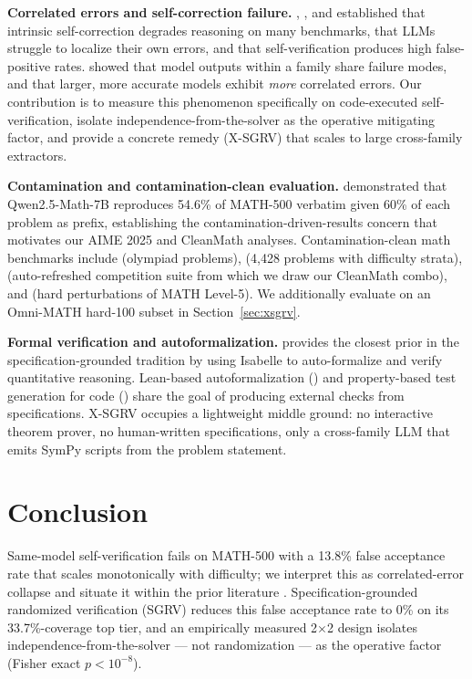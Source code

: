 \documentclass{article}
\begin{document}
\textbf{Correlated errors and self-correction failure.} \citet{huang2024selfcorrect}, \citet{tyen2024llm}, and \citet{stechly2024selfverify} established that intrinsic self-correction degrades reasoning on many benchmarks, that LLMs struggle to localize their own errors, and that self-verification produces high false-positive rates. \citet{kim2025correlated} showed that model outputs within a family share failure modes, and that larger, more accurate models exhibit \emph{more} correlated errors. Our contribution is to measure this phenomenon specifically on code-executed self-verification, isolate independence-from-the-solver as the operative mitigating factor, and provide a concrete remedy (X-SGRV) that scales to large cross-family extractors.

\textbf{Contamination and contamination-clean evaluation.} \citet{wu2025contam} demonstrated that Qwen2.5-Math-7B reproduces 54.6\% of MATH-500 verbatim given 60\% of each problem as prefix, establishing the contamination-driven-results concern that motivates our AIME 2025 and CleanMath analyses. Contamination-clean math benchmarks include \citet{olympiadbench2024} (olympiad problems), \citet{omnimath2024} (4{,}428 problems with difficulty strata), \citet{matharena2025} (auto-refreshed competition suite from which we draw our CleanMath combo), and \citet{mathperturb2025} (hard perturbations of MATH Level-5). We additionally evaluate on an Omni-MATH hard-100 subset in Section~\ref{sec:xsgrv}.

\textbf{Formal verification and autoformalization.} \citet{dtv2024} provides the closest prior in the specification-grounded tradition by using Isabelle to auto-formalize and verify quantitative reasoning. Lean-based autoformalization (\citealt{hermes2025}) and property-based test generation for code (\citealt{pgs2025, quickcheck2000}) share the goal of producing external checks from specifications. X-SGRV occupies a lightweight middle ground: no interactive theorem prover, no human-written specifications, only a cross-family LLM that emits SymPy scripts from the problem statement.

\fussy

\section{Conclusion}

Same-model self-verification fails on MATH-500 with a 13.8\% false acceptance rate that scales monotonically with difficulty; we interpret this as correlated-error collapse and situate it within the prior literature \citep{huang2024selfcorrect, tyen2024llm, stechly2024selfverify, kim2025correlated}. Specification-grounded randomized verification (SGRV) reduces this false acceptance rate to 0\% on its 33.7\%-coverage top tier, and an empirically measured 2$\times$2 design isolates independence-from-the-solver --- not randomization --- as the operative factor (Fisher exact $p < 10^{-8}$).
\end{document}
